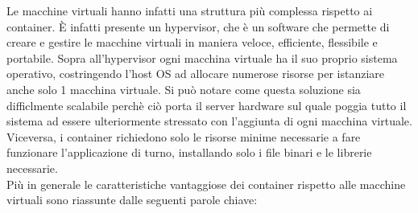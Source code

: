 Le macchine virtuali hanno infatti una struttura più complessa rispetto ai container. È infatti presente un hypervisor\cite{hypervisor}, che è un software che permette di creare e gestire le macchine virtuali in maniera veloce, efficiente, flessibile e portabile.
Sopra all'hypervisor ogni macchina virtuale ha il suo proprio sistema operativo, costringendo l'host OS ad allocare numerose risorse per istanziare anche solo 1 macchina virtuale. Si può notare come questa soluzione sia difficlmente scalabile perchè
ciò porta il server hardware sul quale poggia tutto il sistema ad essere ulteriormente stressato con l'aggiunta di ogni macchina virtuale. Viceversa, i container richiedono solo le risorse minime necessarie a fare funzionare l'applicazione di turno, installando solo i file binari e le librerie necessarie.\\
Più in generale le caratteristiche vantaggiose dei container rispetto alle macchine virtuali sono riassunte dalle seguenti parole chiave:\\



